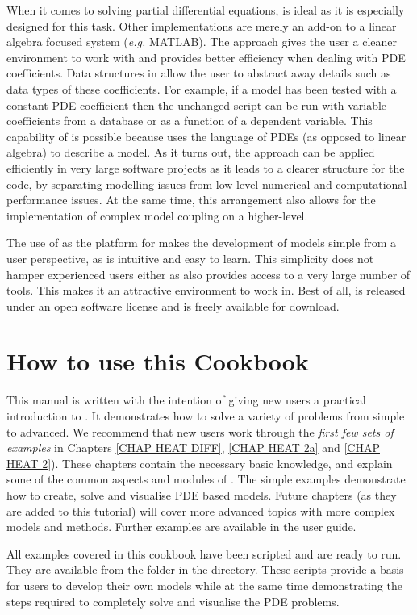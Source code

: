 When it comes to solving partial differential equations, \esc is ideal as it is
especially designed for this task. Other implementations are merely an add-on to
a linear algebra focused system (\textit{e.g.} MATLAB). The \esc approach gives
the user a cleaner environment to work with and provides better efficiency when
dealing with PDE coefficients. Data structures in \esc allow the user to
abstract away details such as data types of these coefficients. For example, if
a model has been tested with a constant PDE coefficient then the unchanged
script can be run with variable coefficients from a database or as a function of
a dependent variable. This capability of \esc is possible because \esc uses the
language of PDEs (as opposed to linear algebra) to describe a model. As it turns
out, the \esc approach can be applied efficiently in very large software
projects as it leads to a clearer structure for the code, by separating
modelling issues from low-level numerical and computational performance issues. 
At the same time, this arrangement also allows for the implementation of complex
model coupling on a higher-level. 

The use of \pyt as the platform for \esc makes the development of models simple
from a user perspective, as \pyt is intuitive and easy to learn. This simplicity
does not hamper experienced users either as \pyt also provides access to a very
large number of tools. This makes it an attractive environment to work in. Best
of all, \esc is released under an open software license and is freely available
for download.

\section{How to use this Cookbook}
This manual is written with the intention of giving new users a practical
introduction to \esc. It demonstrates how to solve a variety of problems from
simple to advanced. We recommend that new users work through the
\textit{first few sets of examples} in Chapters \ref{CHAP HEAT DIFF},
\ref{CHAP HEAT 2a} and \ref{CHAP HEAT 2}).
These chapters contain the necessary basic knowledge, and explain some of the
common aspects and modules of \esc. The simple examples demonstrate how to
create, solve and visualise PDE based models.
Future chapters (as they are added to this tutorial) will cover more advanced
topics with more complex models and methods. Further examples are available in
the \esc user guide.

All examples covered in this cookbook have been scripted and are ready to run.
They are available from the \exf folder in the \esc directory. These scripts
provide a basis for users to develop their own models while at the same time
demonstrating the steps required to completely solve and visualise the PDE
problems.




